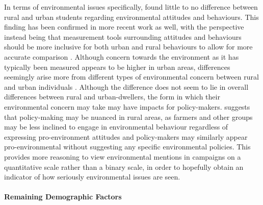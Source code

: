 \documentclass[12pt,letterpaper]{article}
\begin{document}
In terms of environmental issues specifically, \textcite{bognerEnvironmentalPerceptionRural1997} found little to no difference between rural and urban students regarding environmental attitudes and behaviours. This finding has been confirmed in more recent work as well, with the perspective instead being that measurement tools surrounding attitudes and behaviours should be more inclusive for both urban and rural behaviours to allow for more accurate comparison \autocite{huddart-kennedyRuralUrbanDifferencesEnvironmental2009}. Although concern towards the environment as it has typically been measured appears to be higher in urban areas, differences seemingly arise more from different types of environmental concern between rural and urban individuals \autocite{deberenguerRuralUrbanDifferencesEnvironmental2005}. Although the difference does not seem to lie in overall differences between rural and urban-dwellers, the form in which their environmental concern may take may have impacts for policy-makers. \textcite{freudenburgRuralUrbanDifferencesEnvironmental1991} suggests that policy-making may be nuanced in rural areas, as farmers and other groups may be less inclined to engage in environmental behaviour regardless of expressing pro-environment attitudes and policy-makers may similarly appear pro-environmental without suggesting any specific environmental policies. This provides more reasoning to view environmental mentions in campaigns on a quantitative scale rather than a binary scale, in order to hopefully obtain an indicator of how seriously environmental issues are seen.

\paragraph{Remaining Demographic Factors}
\end{document}
